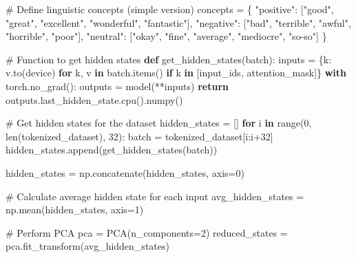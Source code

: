\documentclass[
  letterpaper,
  DIV=11,
  numbers=noendperiod]{scrreprt}
\newenvironment{Shaded}{\begin{snugshade}}{\end{snugshade}}
\newcommand{\BuiltInTok}[1]{\textcolor[rgb]{0.00,0.23,0.31}{#1}}
\newcommand{\CommentTok}[1]{\textcolor[rgb]{0.37,0.37,0.37}{#1}}
\newcommand{\ControlFlowTok}[1]{\textcolor[rgb]{0.00,0.23,0.31}{\textbf{#1}}}
\newcommand{\DecValTok}[1]{\textcolor[rgb]{0.68,0.00,0.00}{#1}}
\newcommand{\KeywordTok}[1]{\textcolor[rgb]{0.00,0.23,0.31}{\textbf{#1}}}
\newcommand{\NormalTok}[1]{\textcolor[rgb]{0.00,0.23,0.31}{#1}}
\newcommand{\OperatorTok}[1]{\textcolor[rgb]{0.37,0.37,0.37}{#1}}
\newcommand{\StringTok}[1]{\textcolor[rgb]{0.13,0.47,0.30}{#1}}
\begin{document}
\begin{Shaded}
\begin{Highlighting}[]
\CommentTok{\# Define linguistic concepts (simple version)}
\NormalTok{concepts }\OperatorTok{=}\NormalTok{ \{}
    \StringTok{"positive"}\NormalTok{: [}\StringTok{"good"}\NormalTok{, }\StringTok{"great"}\NormalTok{, }\StringTok{"excellent"}\NormalTok{, }\StringTok{"wonderful"}\NormalTok{, }\StringTok{"fantastic"}\NormalTok{],}
    \StringTok{"negative"}\NormalTok{: [}\StringTok{"bad"}\NormalTok{, }\StringTok{"terrible"}\NormalTok{, }\StringTok{"awful"}\NormalTok{, }\StringTok{"horrible"}\NormalTok{, }\StringTok{"poor"}\NormalTok{],}
    \StringTok{"neutral"}\NormalTok{: [}\StringTok{"okay"}\NormalTok{, }\StringTok{"fine"}\NormalTok{, }\StringTok{"average"}\NormalTok{, }\StringTok{"mediocre"}\NormalTok{, }\StringTok{"so{-}so"}\NormalTok{]}
\NormalTok{\}}

\CommentTok{\# Function to get hidden states}
\KeywordTok{def}\NormalTok{ get\_hidden\_states(batch):}
\NormalTok{    inputs }\OperatorTok{=}\NormalTok{ \{k: v.to(device) }\ControlFlowTok{for}\NormalTok{ k, v }\KeywordTok{in}\NormalTok{ batch.items() }\ControlFlowTok{if}\NormalTok{ k }\KeywordTok{in}\NormalTok{ [}\StringTok{\textquotesingle{}input\_ids\textquotesingle{}}\NormalTok{, }\StringTok{\textquotesingle{}attention\_mask\textquotesingle{}}\NormalTok{]\}}
    \ControlFlowTok{with}\NormalTok{ torch.no\_grad():}
\NormalTok{        outputs }\OperatorTok{=}\NormalTok{ model(}\OperatorTok{**}\NormalTok{inputs)}
    \ControlFlowTok{return}\NormalTok{ outputs.last\_hidden\_state.cpu().numpy()}

\CommentTok{\# Get hidden states for the dataset}
\NormalTok{hidden\_states }\OperatorTok{=}\NormalTok{ []}
\ControlFlowTok{for}\NormalTok{ i }\KeywordTok{in} \BuiltInTok{range}\NormalTok{(}\DecValTok{0}\NormalTok{, }\BuiltInTok{len}\NormalTok{(tokenized\_dataset), }\DecValTok{32}\NormalTok{):}
\NormalTok{    batch }\OperatorTok{=}\NormalTok{ tokenized\_dataset[i:i}\OperatorTok{+}\DecValTok{32}\NormalTok{]}
\NormalTok{    hidden\_states.append(get\_hidden\_states(batch))}

\NormalTok{hidden\_states }\OperatorTok{=}\NormalTok{ np.concatenate(hidden\_states, axis}\OperatorTok{=}\DecValTok{0}\NormalTok{)}

\CommentTok{\# Calculate average hidden state for each input}
\NormalTok{avg\_hidden\_states }\OperatorTok{=}\NormalTok{ np.mean(hidden\_states, axis}\OperatorTok{=}\DecValTok{1}\NormalTok{)}

\CommentTok{\# Perform PCA}
\NormalTok{pca }\OperatorTok{=}\NormalTok{ PCA(n\_components}\OperatorTok{=}\DecValTok{2}\NormalTok{)}
\NormalTok{reduced\_states }\OperatorTok{=}\NormalTok{ pca.fit\_transform(avg\_hidden\_states)}


\end{Highlighting}
\end{Shaded}
\end{document}
